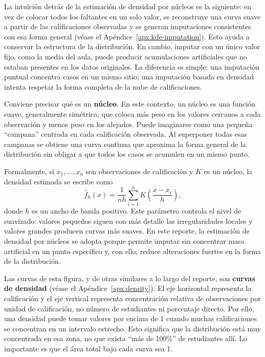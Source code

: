 \documentclass[10pt,letterpaper]{article} %
\numberwithin{figure}{subsection}
\begin{document}
La intuición detrás de la estimación de densidad por núcleos es la siguiente: en vez de colocar todos los faltantes en un solo valor, se reconstruye una curva suave a partir de las calificaciones observadas y se generan imputaciones consistentes con esa forma general (véase el Apéndice~\ref{apx:kde-imputation}). Esto ayuda a conservar la estructura de la distribución. En cambio, imputar con un único valor fijo, como la media del aula, puede producir acumulaciones artificiales que no estaban presentes en los datos originales. La diferencia es simple: una imputación puntual concentra casos en un mismo sitio; una imputación basada en densidad intenta respetar la forma completa de la nube de calificaciones.

Conviene precisar qué es un \textbf{núcleo}. En este contexto, un núcleo es una función suave, generalmente simétrica, que coloca más peso en los valores cercanos a cada observación y menos peso en los alejados. Puede imaginarse como una pequeña ``campana'' centrada en cada calificación observada. Al superponer todas esas campanas se obtiene una curva continua que aproxima la forma general de la distribución sin obligar a que todos los casos se acumulen en un mismo punto.

Formalmente, si $x_1,\dots,x_n$ son observaciones de calificación y $K$ es un núcleo, la densidad estimada se escribe como
\[
\hat f_h(x)=\frac{1}{nh}\sum_{i=1}^n K\!\left(\frac{x-x_i}{h}\right),
\]
donde $h$ es un ancho de banda positivo. Este parámetro controla el nivel de suavizado: valores pequeños siguen con más detalle las irregularidades locales y valores grandes producen curvas más suaves. En este reporte, la estimación de densidad por núcleos se adopta porque permite imputar sin concentrar masa artificial en un punto específico y, con ello, reduce alteraciones fuertes en la forma de la distribución.

Las curvas de esta figura, y de otras similares a lo largo del reporte, son \textbf{curvas de densidad} (véase el Apéndice~\ref{apx:density}). El eje horizontal representa la calificación y el eje vertical representa concentración relativa de observaciones por unidad de calificación, no número de estudiantes ni porcentaje directo. Por ello, una densidad puede tomar valores por encima de 1 cuando muchas calificaciones se concentran en un intervalo estrecho. Esto significa que la distribución está muy concentrada en esa zona, no que exista ``más de 100\%'' de estudiantes allí. Lo importante es que el área total bajo cada curva sea 1.
\end{document}
